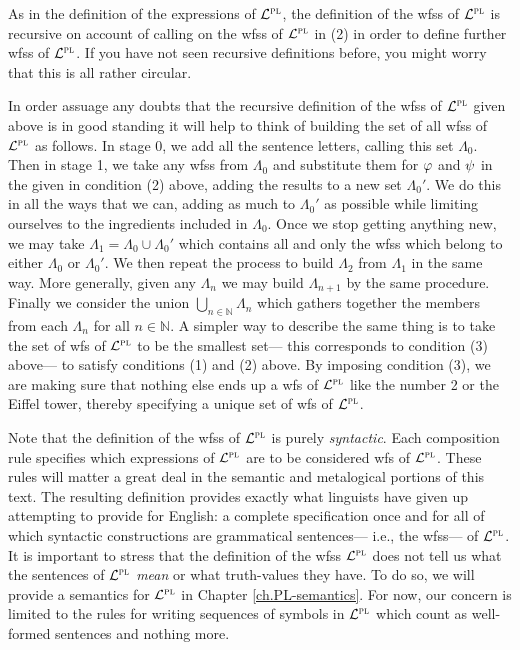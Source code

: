 As in the definition of the expressions of $\mathcal{L}^{\textsc{pl}}$, the definition of the wfss of $\mathcal{L}^{\textsc{pl}}$ is recursive on account of calling on the wfss of $\mathcal{L}^{\textsc{pl}}$ in (2) in order to define further wfss of $\mathcal{L}^{\textsc{pl}}$.
If you have not seen recursive definitions before, you might worry that this is all rather circular.

In order assuage any doubts that the recursive definition of the wfss of $\mathcal{L}^{\textsc{pl}}$ given above is in good standing it will help to think of building the set of all wfss of $\mathcal{L}^{\textsc{pl}}$ as follows.
In stage 0, we add all the sentence letters, calling this set $\Lambda_0$.
Then in stage 1, we take any wfss from $\Lambda_0$ and substitute them for $\varphi$ and $\psi$ in the  given in condition (2) above, adding the results to a new set $\Lambda_0'$.
We do this in all the ways that we can, adding as much to $\Lambda_0'$ as possible while limiting ourselves to the ingredients included in $\Lambda_0$. 
Once we stop getting anything new, we may take $\Lambda_1 = \Lambda_0 \cup \Lambda_0'$ which contains all and only the wfss which belong to either $\Lambda_0$ or $\Lambda_0'$.
We then repeat the process to build $\Lambda_2$ from $\Lambda_1$ in the same way.
More generally, given any $\Lambda_n$ we may build $\Lambda_{n+1}$ by the same procedure.
Finally we consider the union $\bigcup_{n\in \mathbb{N}}\Lambda_n$ which gathers together the members from each $\Lambda_n$ for all $n \in \mathbb{N}$.
A simpler way to describe the same thing is to take the set of wfs of $\mathcal{L}^{\textsc{pl}}$ to be the smallest set--- this corresponds to condition (3) above--- to satisfy conditions (1) and (2) above.
By imposing condition (3), we are making sure that nothing else ends up a wfs of $\mathcal{L}^{\textsc{pl}}$ like the number 2 or the Eiffel tower, thereby specifying a unique set of wfs of $\mathcal{L}^{\textsc{pl}}$.

Note that the definition of the wfss of $\mathcal{L}^{\textsc{pl}}$ is purely \emph{syntactic}.
Each composition rule specifies which expressions of $\mathcal{L}^{\textsc{pl}}$ are to be considered wfs of $\mathcal{L}^{\textsc{pl}}$.
These rules will matter a great deal in the semantic and metalogical portions of this text.
The resulting definition provides exactly what linguists have given up attempting to provide for English: a complete specification once and for all of which syntactic constructions are grammatical sentences--- i.e., the wfss--- of $\mathcal{L}^{\textsc{pl}}$.
It is important to stress that the definition of the wfss $\mathcal{L}^{\textsc{pl}}$ does not tell us what the sentences of $\mathcal{L}^{\textsc{pl}}$ \textit{mean} or what truth-values they have.
To do so, we will provide a semantics for $\mathcal{L}^{\textsc{pl}}$ in Chapter \ref{ch.PL-semantics}.
For now, our concern is limited to the rules for writing sequences of symbols in $\mathcal{L}^{\textsc{pl}}$ which count as well-formed sentences and nothing more.


